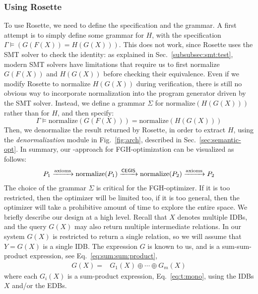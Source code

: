 \subsubsection{Using Rosette} To use Rosette, we need to define the
specification and the grammar. A first attempt is to simply define
some grammar for $H$, with the specification
$\Gamma \models \left(G(F(X)) = H(G(X))\right)$.  This does not work,
since Rosette uses the SMT solver to check the identity: as explained
in Sec.~\ref{subsubsec:smt:test}, modern SMT solvers have limitations
that require us to first normalize $G(F(X))$ and $H(G(X))$ before
checking their equivalence.
Even if we modify Rosette
to normalize $H(G(X))$ during verification,
there is still no obvious way to incorporate normalization
into the program generator driven by the SMT solver.
Instead,
we define a grammar $\Sigma$ for $\text{normalize}(H(G(X)))$ rather
than for $H$, and then specify:
\[
\Gamma \models \text{normalize}(G(F(X))) = \text{normalize}(H(G(X)))
\]
Then, we denormalize the result
returned by Rosette, in order to extract $H$, using the {\em
  denormalization} module in Fig.~\ref{fig:arch}, described in
Sec.~\ref{sec:semantic-opt}.  In summary, our \cegis-approach for
FGH-optimization can be visualized as follows:
%
\begin{align}
  P_{1} \xrightarrow[]{\text{axioms}} \text{normalize}(P_{1}) \xrightarrow[]{\textsf{CEGIS}} \text{normalize}(P_{2}) \xrightarrow[]{\text{axioms}} P_{2}
  \label{eq:synthesis:cegis2}
\end{align}
%
The choice of the grammar $\Sigma$ is critical for the FGH-optimizer.
If it is too restricted, then the optimizer will be limited too, if it
is too general, then the optimizer will take a prohibitive amount of
time to explore the entire space.  We briefly describe our design at a
high level.  Recall that $X$ denotes multiple IDBs, and the query
$G(X)$ may also return multiple intermediate relations. In our system
$G(X)$ is restricted to return a single relation, so we will assume
that $Y = G(X)$ is a single IDB.  The expression $G$ is known to us,
and is a sum-sum-product expression, see
Eq.~\eqref{eq:sum:sum:product},
%
\begin{align*}
  G(X) = & G_1(X) \oplus \cdots \oplus G_m(X)
\end{align*}
%
where each $G_i(X)$ is a sum-product expression,
Eq.~\eqref{eq:t:mono}, using the IDBs $X$ and/or the EDBs.

